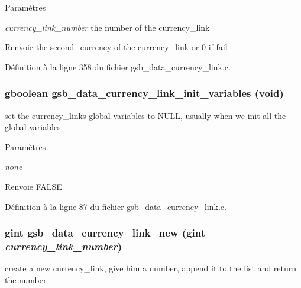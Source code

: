 \begin{DoxyParams}{Paramètres}
\item[{\em currency\_\-link\_\-number}]the number of the currency\_\-link\end{DoxyParams}
\begin{DoxyReturn}{Renvoie}
the second\_\-currency of the currency\_\-link or 0 if fail 
\end{DoxyReturn}


Définition à la ligne 358 du fichier gsb\_\-data\_\-currency\_\-link.c.

\subsubsection[{gsb\_\-data\_\-currency\_\-link\_\-init\_\-variables}]{\setlength{\rightskip}{0pt plus 5cm}gboolean gsb\_\-data\_\-currency\_\-link\_\-init\_\-variables (void)}\label{gsb__data__currency__link_8c_a4cd0e66deb9185816119a0ddd973f1c6}
set the currency\_\-links global variables to NULL, usually when we init all the global variables


\begin{DoxyParams}{Paramètres}
\item[{\em none}]\end{DoxyParams}
\begin{DoxyReturn}{Renvoie}
FALSE 
\end{DoxyReturn}


Définition à la ligne 87 du fichier gsb\_\-data\_\-currency\_\-link.c.

\subsubsection[{gsb\_\-data\_\-currency\_\-link\_\-new}]{\setlength{\rightskip}{0pt plus 5cm}gint gsb\_\-data\_\-currency\_\-link\_\-new (gint {\em currency\_\-link\_\-number})}\label{gsb__data__currency__link_8c_a78bdeb826c13c39ba178ac66c41f17aa}
create a new currency\_\-link, give him a number, append it to the list and return the number


